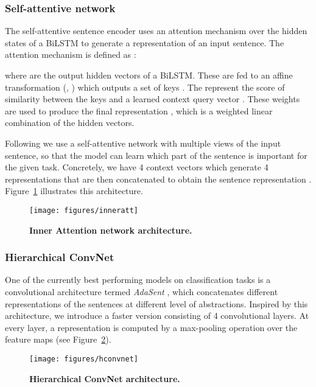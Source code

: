 \documentclass[11pt,letterpaper]{article}
\begin{document}
\subsubsection{Self-attentive network}
The self-attentive sentence encoder \cite{liu2016learning, lin2017structured} uses an attention mechanism over the hidden states of a BiLSTM to generate a representation  of an input sentence. The attention mechanism is defined as :
\vspace{-1pt}


where  are the output hidden vectors of a BiLSTM. These are fed to an affine transformation (, ) which outputs a set of keys . The  represent the score of similarity between the keys and a learned context query vector . These weights are used to produce the final representation , which is a weighted linear combination of the hidden vectors.

Following \citet{lin2017structured} we use a self-attentive network with multiple views of the input sentence, so that the model can learn which part of the sentence is important for the given task. Concretely, we have 4 context vectors  which generate 4 representations that are then concatenated to obtain the sentence representation . Figure~\ref{fig:inneratt} illustrates this architecture.

\begin{figure}[h!]
  \centering
  \texttt{[image: figures/inneratt]}
    \caption{\bf Inner Attention network architecture.}
  \label{fig:inneratt}
\end{figure}

\subsubsection{Hierarchical ConvNet}
One of the currently best performing models on classification tasks is a convolutional architecture termed {\it AdaSent} \cite{zhao2015self}, which concatenates different representations of the sentences at different level of abstractions. Inspired by this architecture, we introduce a faster version consisting of 4 convolutional layers. At every layer, a representation  is computed by a max-pooling operation over the feature maps (see Figure~\ref{fig:hconvnet}).

\begin{figure}[h!]
  \centering
  \texttt{[image: figures/hconvnet]}
    \caption{\bf Hierarchical ConvNet architecture.}
    \label{fig:hconvnet}
\end{figure}
\end{document}

